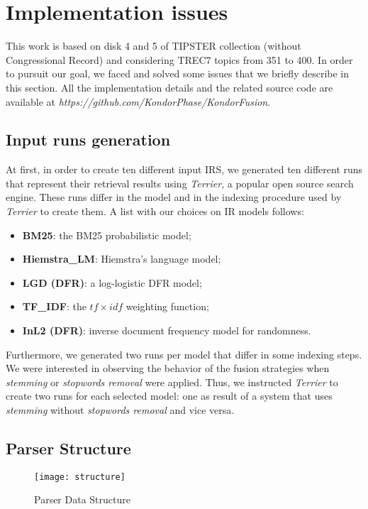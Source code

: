 \documentclass[letterpaper, 10 pt, conference]{ieeeconf}  %
\begin{document}
\section{Implementation issues}
This work is based on disk 4 and 5 of TIPSTER collection (without Congressional Record) and considering TREC7 topics from 351 to 400. In order to pursuit our goal, we faced and solved some issues that we briefly describe in this section. All the implementation details and the related source code are available at \textit{https://github.com/KondorPhase/KondorFusion}.

\subsection{Input runs generation}
At first, in order to create ten different input IRS, we generated ten different runs that represent their retrieval results using \textit{Terrier}, a popular open source search engine. These runs differ in the model and in the indexing procedure used by \textit{Terrier} to create them. A list with our choices on IR models follows:
\begin{itemize}
\item \textbf{BM25}: the BM25 probabilistic model;
\item \textbf{Hiemstra\_LM}: Hiemstra's language model;
\item \textbf{LGD (DFR)}: a log-logistic DFR model;
\item \textbf{TF\_IDF}: the $tf\times idf$ weighting function;
\item \textbf{InL2 (DFR)}: inverse document frequency model for randomness.
\end{itemize}

Furthermore, we generated two runs per model that differ in some indexing steps. We were interested in observing the behavior of the fusion strategies when \textit{stemming} or \textit{stopwords removal} were applied. Thus, we instructed \textit{Terrier} to create two runs for each selected model: one as result of a system that uses \textit{stemming} without \textit{stopwords removal} and vice versa.

\subsection{Parser Structure}
\begin{figure}[!htbp]
\centering
\texttt{[image: structure]}
\caption{Parser Data Structure}
\label{FIG:Data Structure}
\end{figure}
\end{document}
